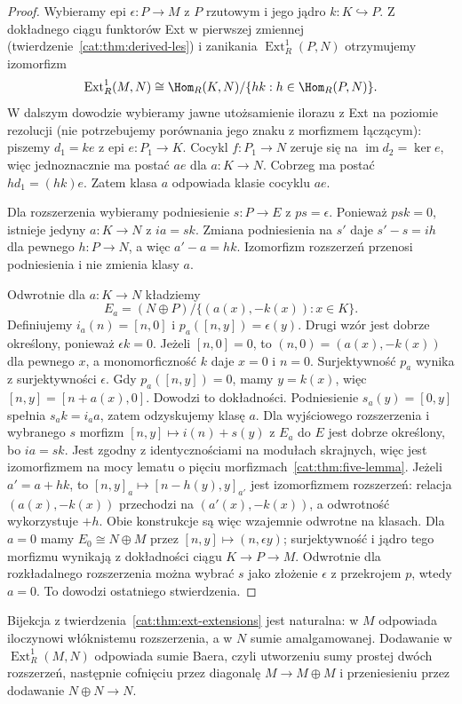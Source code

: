 \begin{proof}
Wybieramy epi $\epsilon:P\to M$ z $P$ rzutowym i jego jądro $k:K\hookrightarrow P$. Z dokładnego ciągu funktorów Ext w pierwszej zmiennej (twierdzenie~\ref{cat:thm:derived-les}) i zanikania $\operatorname{Ext}_R^1(P,N)$ otrzymujemy izomorfizm
\[
 \operatorname{Ext}_R^1(M,N)\cong
 \Hom_R(K,N)/\{hk:h\in\Hom_R(P,N)\}.
\]
W dalszym dowodzie wybieramy jawne utożsamienie ilorazu z Ext na poziomie rezolucji (nie potrzebujemy porównania jego znaku z morfizmem łączącym): piszemy $d_1=ke$ z epi $e:P_1\to K$. Cocykl $f:P_1\to N$ zeruje się na $\operatorname{im}d_2=\ker e$, więc jednoznacznie ma postać $ae$ dla $a:K\to N$. Cobrzeg ma postać $hd_1=(hk)e$. Zatem klasa $a$ odpowiada klasie cocyklu $ae$.

Dla rozszerzenia wybieramy podniesienie $s:P\to E$ z $ps=\epsilon$. Ponieważ $psk=0$, istnieje jedyny $a:K\to N$ z $ia=sk$. Zmiana podniesienia na $s'$ daje $s'-s=ih$ dla pewnego $h:P\to N$, a więc $a'-a=hk$. Izomorfizm rozszerzeń przenosi podniesienia i nie zmienia klasy $a$.

Odwrotnie dla $a:K\to N$ kładziemy
\[
 E_a=(N\oplus P)/\{(a(x),-k(x)):x\in K\}.
\]
Definiujemy $i_a(n)=[n,0]$ i $p_a([n,y])=\epsilon(y)$. Drugi wzór jest dobrze określony, ponieważ $\epsilon k=0$. Jeżeli $[n,0]=0$, to $(n,0)=(a(x),-k(x))$ dla pewnego $x$, a monomorficzność $k$ daje $x=0$ i $n=0$. Surjektywność $p_a$ wynika z surjektywności $\epsilon$. Gdy $p_a([n,y])=0$, mamy $y=k(x)$, więc $[n,y]=[n+a(x),0]$. Dowodzi to dokładności. Podniesienie $s_a(y)=[0,y]$ spełnia $s_ak=i_aa$, zatem odzyskujemy klasę $a$.
Dla wyjściowego rozszerzenia i wybranego $s$ morfizm $[n,y]\mapsto i(n)+s(y)$ z $E_a$ do $E$ jest dobrze określony, bo $ia=sk$. Jest zgodny z identycznościami na modułach skrajnych, więc jest izomorfizmem na mocy lematu o pięciu morfizmach~\ref{cat:thm:five-lemma}. Jeżeli $a'=a+hk$, to $[n,y]_a\mapsto[n-h(y),y]_{a'}$ jest izomorfizmem rozszerzeń: relacja $(a(x),-k(x))$ przechodzi na $(a'(x),-k(x))$, a odwrotność wykorzystuje $+h$. Obie konstrukcje są więc wzajemnie odwrotne na klasach.
Dla $a=0$ mamy $E_0\cong N\oplus M$ przez $[n,y]\mapsto(n,\epsilon y)$; surjektywność i jądro tego morfizmu wynikają z dokładności ciągu $K\to P\to M$. Odwrotnie dla rozkładalnego rozszerzenia można wybrać $s$ jako złożenie $\epsilon$ z przekrojem $p$, wtedy $a=0$. To dowodzi ostatniego stwierdzenia.
\end{proof}
\begin{stwierdzenie}\label{cat:prop:baer-sum}
Bijekcja z twierdzenia~\ref{cat:thm:ext-extensions} jest naturalna: w $M$ odpowiada iloczynowi włóknistemu rozszerzenia, a w $N$ sumie amalgamowanej. Dodawanie w $\operatorname{Ext}_R^1(M,N)$ odpowiada sumie Baera, czyli utworzeniu sumy prostej dwóch rozszerzeń, następnie cofnięciu przez diagonalę $M\to M\oplus M$ i przeniesieniu przez dodawanie $N\oplus N\to N$.
\end{stwierdzenie}
